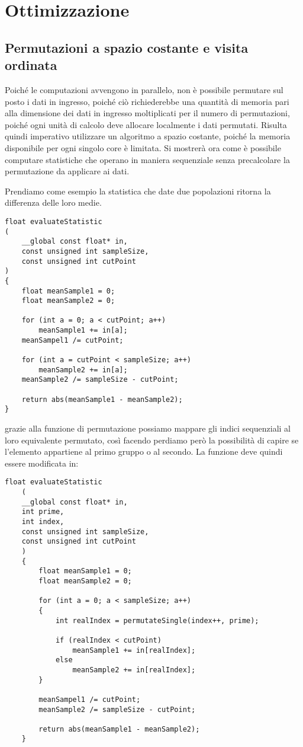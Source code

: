 \section{Ottimizzazione} \label{ottimizzazione}

\subsection{Permutazioni a spazio costante e visita ordinata}
Poiché le computazioni avvengono in parallelo, non è possibile permutare sul posto i dati in ingresso, poiché ciò richiederebbe una quantità di memoria pari alla dimensione dei dati in ingresso moltiplicati per il numero di permutazioni, poiché ogni unità di calcolo deve allocare localmente i dati permutati. Risulta quindi imperativo utilizzare un algoritmo a spazio costante, poiché la memoria disponibile per ogni singolo core è limitata.
Si mostrerà ora come è possibile computare statistiche che operano in maniera sequenziale senza precalcolare la permutazione da applicare ai dati.

Prendiamo come esempio la statistica che date due popolazioni ritorna la differenza delle loro medie.

\begin{lstlisting}[style=CStyle]
float evaluateStatistic
(
	__global const float* in, 
	const unsigned int sampleSize, 
	const unsigned int cutPoint
)
{
	float meanSample1 = 0;
	float meanSample2 = 0;
	
	for (int a = 0; a < cutPoint; a++)
		meanSample1 += in[a];
	meanSampel1 /= cutPoint;
		
	for (int a = cutPoint < sampleSize; a++)
		meanSample2 += in[a];
	meanSample2 /= sampleSize - cutPoint;	
	
	return abs(meanSample1 - meanSample2);
}
\end{lstlisting}

grazie alla funzione di permutazione possiamo mappare gli indici sequenziali al loro equivalente permutato, così facendo perdiamo però la possibilità di capire se l'elemento appartiene al primo gruppo o al secondo.
La funzione deve quindi essere modificata in:

\begin{lstlisting}[style=CStyle]
	float evaluateStatistic
	(
	__global const float* in,
	int prime,
	int index,
	const unsigned int sampleSize, 
	const unsigned int cutPoint
	)
	{
		float meanSample1 = 0;
		float meanSample2 = 0;
		
		for (int a = 0; a < sampleSize; a++)
		{
			int realIndex = permutateSingle(index++, prime);
			
			if (realIndex < cutPoint)
				meanSample1 += in[realIndex];
			else
				meanSample2 += in[realIndex];
		}
		
		meanSampel1 /= cutPoint;
		meanSample2 /= sampleSize - cutPoint;	
		
		return abs(meanSample1 - meanSample2);
	}
\end{lstlisting}


